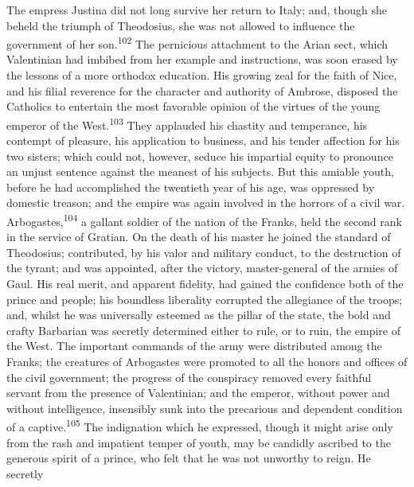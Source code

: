 
The empress Justina did not long survive her return to Italy;
and, though she beheld the triumph of Theodosius, she was not
allowed to influence the government of her son.\textsuperscript{102} The
pernicious attachment to the Arian sect, which Valentinian had
imbibed from her example and instructions, was soon erased by the
lessons of a more orthodox education. His growing zeal for the
faith of Nice, and his filial reverence for the character and
authority of Ambrose, disposed the Catholics to entertain the
most favorable opinion of the virtues of the young emperor of the
West.\textsuperscript{103} They applauded his chastity and temperance, his
contempt of pleasure, his application to business, and his tender
affection for his two sisters; which could not, however, seduce
his impartial equity to pronounce an unjust sentence against the
meanest of his subjects. But this amiable youth, before he had
accomplished the twentieth year of his age, was oppressed by
domestic treason; and the empire was again involved in the
horrors of a civil war. Arbogastes,\textsuperscript{104} a gallant soldier of the
nation of the Franks, held the second rank in the service of
Gratian. On the death of his master he joined the standard of
Theodosius; contributed, by his valor and military conduct, to
the destruction of the tyrant; and was appointed, after the
victory, master-general of the armies of Gaul. His real merit,
and apparent fidelity, had gained the confidence both of the
prince and people; his boundless liberality corrupted the
allegiance of the troops; and, whilst he was universally esteemed
as the pillar of the state, the bold and crafty Barbarian was
secretly determined either to rule, or to ruin, the empire of the
West. The important commands of the army were distributed among
the Franks; the creatures of Arbogastes were promoted to all the
honors and offices of the civil government; the progress of the
conspiracy removed every faithful servant from the presence of
Valentinian; and the emperor, without power and without
intelligence, insensibly sunk into the precarious and dependent
condition of a captive.\textsuperscript{105} The indignation which he expressed,
though it might arise only from the rash and impatient temper of
youth, may be candidly ascribed to the generous spirit of a
prince, who felt that he was not unworthy to reign. He secretly
